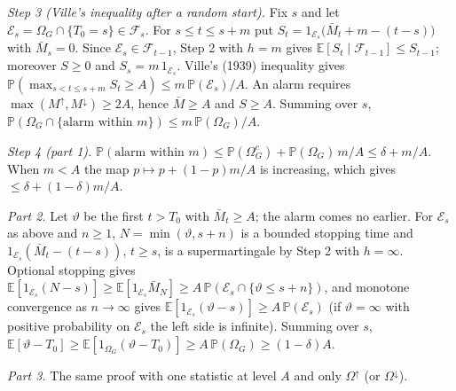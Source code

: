 \documentclass[
]{article}
\begin{document}
\emph{Step 3 (Ville's inequality after a random start).} Fix \(s\) and
let
\(\mathcal{E}_s = \Omega_G \cap \lbrace T_0 = s\rbrace \in \mathcal{F}_s\).
For \(s \le t \le s + m\) put
\(S_t = 1_{\mathcal{E}_s}\big(\bar M_t + m - (t - s)\big)\) with
\(\bar M_s = 0\). Since \(\mathcal{E}_s \in \mathcal{F}_{t-1}\), Step 2
with \(h = m\) gives
\(\mathbb{E}[S_t \mid \mathcal{F}_{t-1}] \le S_{t-1}\); moreover
\(S \ge 0\) and \(S_s = m\,1_{\mathcal{E}_s}\). Ville's (1939)
inequality gives
\(\mathbb{P}(\max_{s < t \le s+m} S_t \ge A) \le m\,\mathbb{P}(\mathcal{E}_s)/A\).
An alarm requires \(\max(M^{\uparrow}, M^{\downarrow}) \ge 2A\), hence
\(\bar M \ge A\) and \(S \ge A\). Summing over \(s\),
\(\mathbb{P}(\Omega_G \cap \lbrace \text{alarm within } m\rbrace) \le m\,\mathbb{P}(\Omega_G)/A\).

\emph{Step 4 (part 1).}
\(\mathbb{P}(\text{alarm within } m) \le \mathbb{P}(\Omega_G^c) + \mathbb{P}(\Omega_G)\,m/A \le \delta + m/A\).
When \(m < A\) the map \(p \mapsto p + (1 - p)m/A\) is increasing, which
gives \(\le \delta + (1 - \delta)m/A\).

\emph{Part 2.} Let \(\vartheta\) be the first \(t > T_0\) with
\(\bar M_t \ge A\); the alarm comes no earlier. For \(\mathcal{E}_s\) as
above and \(n \ge 1\), \(N = \min(\vartheta, s + n)\) is a bounded
stopping time and \(1_{\mathcal{E}_s}(\bar M_t - (t - s))\),
\(t \ge s\), is a supermartingale by Step 2 with \(h = \infty\).
Optional stopping gives
\(\mathbb{E}[1_{\mathcal{E}_s}(N - s)] \ge \mathbb{E}[1_{\mathcal{E}_s}\bar M_N] \ge A\,\mathbb{P}(\mathcal{E}_s \cap \lbrace \vartheta \le s + n\rbrace)\),
and monotone convergence as \(n \to \infty\) gives
\(\mathbb{E}[1_{\mathcal{E}_s}(\vartheta - s)] \ge A\,\mathbb{P}(\mathcal{E}_s)\)
(if \(\vartheta = \infty\) with positive probability on
\(\mathcal{E}_s\) the left side is infinite). Summing over \(s\),
\(\mathbb{E}[\vartheta - T_0] \ge \mathbb{E}[1_{\Omega_G}(\vartheta - T_0)] \ge A\,\mathbb{P}(\Omega_G) \ge (1 - \delta)A\).

\emph{Part 3.} The same proof with one statistic at level \(A\) and only
\(\Omega^{\uparrow}\) (or \(\Omega^{\downarrow}\)).
\end{document}

